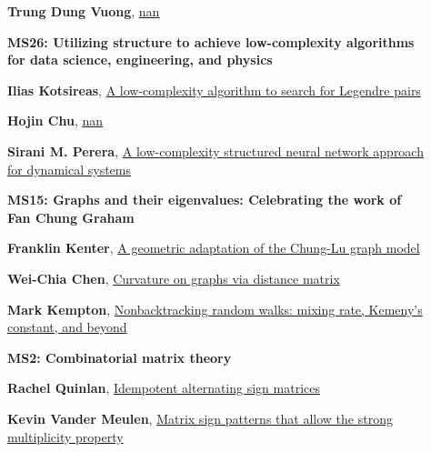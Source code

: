 \documentclass[ILAS2025-program.tex]{subfiles}
\begin{document}
\begin{description}
\begin{description}
        \item[] \hypertarget{up0134}{}\textbf{Trung Dung Vuong}, \hyperlink{down0134}{nan}
        \end{description}
    \begin{description}
    \item[] {\color{mstitle}\textbf{MS26: Utilizing structure to achieve low-complexity algorithms for data science, engineering, and physics}} 
    \item[] \hypertarget{up0135}{}\textbf{Ilias Kotsireas}, \hyperlink{down0135}{A low-complexity algorithm to search for Legendre pairs
}
        \item[] \hypertarget{up0136}{}\textbf{Hojin Chu}, \hyperlink{down0136}{nan}
        \item[] \hypertarget{up0137}{}\textbf{Sirani M. Perera}, \hyperlink{down0137}{A low-complexity structured neural network approach for dynamical systems}
        \end{description}
    \begin{description}
    \item[] {\color{mstitle}\textbf{MS15: Graphs and their eigenvalues: Celebrating the work of Fan Chung Graham}} 
    \item[] \hypertarget{up0138}{}\textbf{Franklin Kenter}, \hyperlink{down0138}{A geometric adaptation of the Chung-Lu graph model}
        \item[] \hypertarget{up0139}{}\textbf{Wei-Chia Chen}, \hyperlink{down0139}{Curvature on graphs via distance matrix}
        \item[] \hypertarget{up0140}{}\textbf{Mark Kempton}, \hyperlink{down0140}{Nonbacktracking random walks: mixing rate, Kemeny's constant, and beyond}
        \end{description}
    \begin{description}
    \item[] {\color{mstitle}\textbf{MS2: Combinatorial matrix theory}} 
    \item[] \hypertarget{up0141}{}\textbf{Rachel Quinlan}, \hyperlink{down0141}{Idempotent alternating sign matrices}
        \item[] \hypertarget{up0142}{}\textbf{Kevin Vander Meulen}, \hyperlink{down0142}{Matrix sign patterns that allow the strong multiplicity property}

\end{description}
\end{description}
\end{document}
